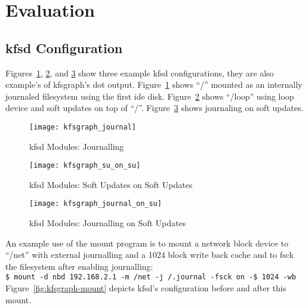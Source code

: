 \section{Evaluation}
\label{sec:eval}

\subsection{kfsd Configuration}
\label{sec:eval:kfsd-config}

\newcommand{\kfsgraphscale}{0.5}

Figures~\ref{fig:kfsgraph-journal}, \ref{fig:kfsgraph-su-on-su}, and
\ref{fig:kfsgraph-journal-on-su} show three example kfsd
configurations, they are also example's of kfsgraph's dot output.
Figure~\ref{fig:kfsgraph-journal} shows ``/'' mounted as an internally
journaled filesystem using the first ide disk.
Figure~\ref{fig:kfsgraph-su-on-su} shows ``/loop'' using loop device
and soft updates on top of ``/''.
Figure~\ref{fig:kfsgraph-journal-on-su} shows journaling on soft
updates.

\begin{figure}[htb]
\begin{center}
  \texttt{[image: kfsgraph\_journal]}
  \caption{kfsd Modules: Journalling}
  \label{fig:kfsgraph-journal}
\end{center}
\end{figure}

\begin{figure}[htb]
\begin{center}
  \texttt{[image: kfsgraph\_su\_on\_su]}
  \caption{kfsd Modules: Soft Updates on Soft Updates}
  \label{fig:kfsgraph-su-on-su}
\end{center}
\end{figure}

\begin{figure}[htb]
\begin{center}
  \texttt{[image: kfsgraph\_journal\_on\_su]}
  \caption{kfsd Modules: Journalling on Soft Updates}
  \label{fig:kfsgraph-journal-on-su}
\end{center}
\end{figure}

An example use of the mount program is to mount a network block device to
``/net'' with external journalling and a 1024 block write back cache and to fsck the filesystem after enabling journalling:\\
\indent \texttt{\$ mount -d nbd 192.168.2.1 -m /net -j /.journal -fsck on -\$ 1024 -wb}\\
Figure~\ref{fig:kfsgraph-mount} depicts kfsd's configuration before and after this mount.

